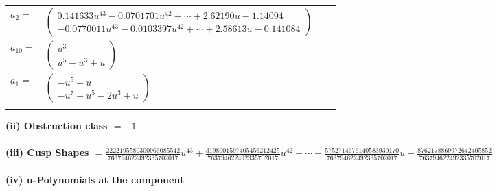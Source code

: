 \documentclass[1p]{elsarticle_modified}
\theoremstyle{definition}
\begin{document}
\begin{tabular}{m{7pt} m{180pt} m{7pt} m{180pt} }
\flushright $a_{2}=$&$\begin{pmatrix}0.141633 u^{43}-0.0701701 u^{42}+\cdots+2.62190 u-1.14094\\-0.0770011 u^{43}-0.0103397 u^{42}+\cdots+2.58613 u-0.141084\end{pmatrix}$ \\
\flushright $a_{10}=$&$\begin{pmatrix}u^3\\u^5- u^3+u\end{pmatrix}$ \\
\flushright $a_{1}=$&$\begin{pmatrix}- u^5- u\\- u^7+u^5-2 u^3+u\end{pmatrix}$\\&\end{tabular}
\flushleft \textbf{(ii) Obstruction class $= -1$}\\~\\
\flushleft \textbf{(iii) Cusp Shapes $= \frac{2222195580300966085542}{763794622492335702017} u^{43}+\frac{3198001597405456212425}{763794622492335702017} u^{42}+\cdots-\frac{5752714676140583930170}{763794622492335702017} u-\frac{8762178869972642405852}{763794622492335702017}$}\\~\\
\newpage\renewcommand{\arraystretch}{1}
\flushleft \textbf{(iv) u-Polynomials at the component}\newline \\
\end{document}
